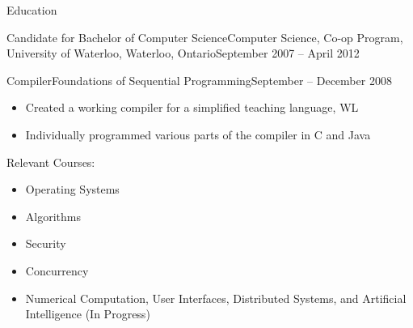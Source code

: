 \documentclass[11pt]{article}
\begin{document}
\begin{section}{Education}
\begin{subsection}{Candidate for Bachelor of Computer Science}{Computer Science, Co-op Program, University of Waterloo, Waterloo, Ontario}{September 2007 -- April 2012}
\begin{indent}
\begin{subsection}{Compiler}{Foundations of Sequential Programming}{September -- December 2008}
					\begin{itemize}
						\item Created a working compiler for a simplified teaching language, WL
						\item Individually programmed various parts of the compiler in C and Java
					\end{itemize}

				\end{subsection}

				\begin{bf}Relevant Courses:\end{bf}

				\begin{itemize}
                    \item Operating Systems
                    \item Algorithms
                    \item Security
                    \item Concurrency
                    \item Numerical Computation, User Interfaces, Distributed Systems, and Artificial Intelligence (In Progress)
				\end{itemize}
			\end{indent}

		\end{subsection}

	\end{section}
\end{document}
